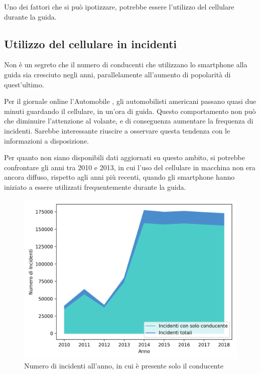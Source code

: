 \documentclass[a4paper,12pt]{report}
\begin{document}
Uno dei fattori che si può ipotizzare, potrebbe 
essere l'utilizzo del cellulare durante la guida. 

\subsection{Utilizzo del cellulare in incidenti}

Non è un segreto che il numero di conducenti 
che utilizzano lo smartphone alla guida 
sia cresciuto negli anni, parallelamente all'aumento di popolarità di quest'ultimo. 

Per il giornale online l'Automobile \cite{AUTOMOBILE:1}, gli automobilisti americani 
passano quasi due minuti guardando il cellulare, in un'ora di guida. 
Questo comportamento non può che diminuire l'attenzione al volante, e di conseguenza 
aumentare la frequenza di incidenti. 
Sarebbe interessante riuscire a osservare questa tendenza con le 
informazioni a disposizione. 

Per quanto non siano disponibili dati aggiornati su questo ambito, si potrebbe confrontare gli 
anni tra 2010 e 2013, in cui l'uso del cellulare in macchina non era ancora diffuso, 
rispetto agli anni più recenti, quando gli smartphone hanno iniziato a essere utilizzati 
frequentemente durante la guida. 

\begin{figure}
    \includegraphics[width=\linewidth]{../src/incidenti/incidenti_senza_coords/anno/incremento_incidenti.png}
    \caption{Numero di incidenti all'anno, in cui è presente solo il conducente}
    \label{fig:incremento-incidenti}
\end{figure}
\end{document}
